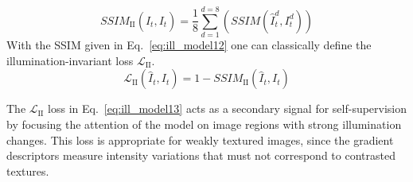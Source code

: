 \documentclass[a4paper,fleqn]{cas-dc}
\begin{document}
%
\begin{equation} \label{eq:ill_model12}
SSIM_{\textrm{II}}\left(\hat{I}_{t}, I_t\right) = \frac{1}{8}\sum\limits_{d=1}^{d=8}\left(SSIM\left(\hat{I}_{t}^{d},I_{t}^{d}\right)\right)
\end{equation}
%
With the SSIM given in Eq.~\eqref{eq:ill_model12} one can classically define the illumination-invariant loss $\mathcal{L}_{\textrm{II}}$.
%
\begin{equation} \label{eq:ill_model13}
\mathcal{L}_{\textrm{II}}\left(\hat{I}_t, I_t\right) = 1 - SSIM_{\textrm{II}}\left(\hat{I}_t, I_t\right)
\end{equation}
%

The $\mathcal{L}_{\textrm{II}}$ loss in Eq.~\eqref{eq:ill_model13} acts as a secondary signal for self-supervision by focusing the attention of the model on image regions with strong illumination changes. This loss is appropriate for weakly textured images, since the gradient descriptors measure intensity variations that must not correspond to contrasted textures.
\end{document}
